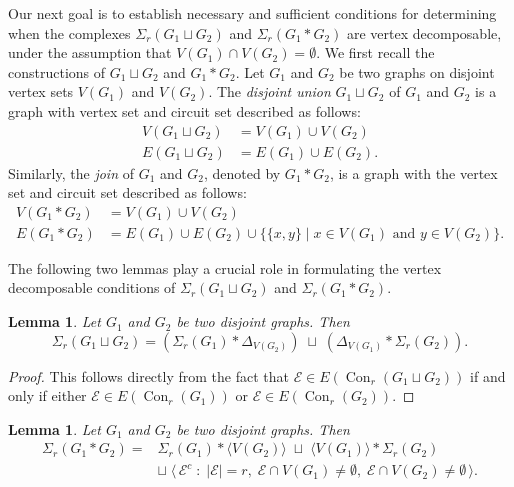 \documentclass[12pt,reqno]{amsart}
\newtheorem{lemma}[proposition]{Lemma}
\theoremstyle{definition}
\def\E{\mathcal{E}}
\begin{document}
\medskip
    
Our next goal is to establish necessary and sufficient conditions for determining when the complexes $\Sigma_r(G_1 \sqcup G_2)$ and $\Sigma_r(G_1 * G_2)$ are vertex decomposable, under the assumption that $V(G_1) \cap V(G_2) = \emptyset$. We first recall the constructions of $G_1 \sqcup G_2$ and $G_1 * G_2$. Let $G_1$ and $G_2$ be two graphs on disjoint vertex sets $V(G_1)$ and $V(G_2)$. The {\it disjoint union} $G_1\sqcup G_2$ of $G_1$ and $G_2$ is a graph with vertex set and circuit set described as follows:
    \begin{align*}
       V(G_1\sqcup G_2)&=V(G_1)\cup V(G_2)\\ 
       E(G_1\sqcup G_2)&=E(G_1)\cup E(G_2).
    \end{align*}
    Similarly, the {\it join} of $G_1$ and $G_2$, denoted by $G_1*G_2$, is a graph with the vertex set and circuit set described as follows:
    \begin{align*}
        V(G_1*G_2)&=V(G_1)\cup V(G_2)\\
        E(G_1*G_2)&=E(G_1)\cup E(G_2)\cup\{\{x,y\}\mid x\in V(G_1)\text{ and }y\in V(G_2)\}.
    \end{align*}
    
    The following two lemmas play a crucial role in formulating the vertex decomposable conditions of $\Sigma_r(G_1 \sqcup G_2)$ and $\Sigma_r(G_1 * G_2)$.

	
	\begin{lemma}\label{Sigma of the disjoint union of graphs}
		Let $G_1$ and $G_2$ be two disjoint graphs. Then
		\[
		\Sigma_r(G_1 \sqcup G_2)
		= (\Sigma_r(G_1) * \Delta_{V(G_2)})
		\;\sqcup\;
		(\Delta_{V(G_1)} * \Sigma_r(G_2)).
		\]
	\end{lemma}
	
	\begin{proof}
    This follows directly from the fact that $\mathcal{E} \in E(\operatorname{Con}_r(G_1 \sqcup G_2))$ if and only if either $\mathcal{E} \in E(\operatorname{Con}_r(G_1))$ or $\mathcal{E} \in E(\operatorname{Con}_r(G_2))$.\end{proof}
	
	\begin{lemma}\label{Sigma of the join of graphs}
		Let $G_1$ and $G_2$ be two disjoint graphs. Then
		\begin{align*}
		    \Sigma_r(G_1 * G_2)
		= & \Sigma_r(G_1) * \langle V(G_2) \rangle
		\;\sqcup\;
		   \langle V(G_1) \rangle * \Sigma_r(G_2)\\
		& \sqcup\; 
		\big\langle\, \E^c \;:\; |\E|=r,\; \E \cap V(G_1)\neq\emptyset,\; \E \cap V(G_2)\neq\emptyset \,\big\rangle.
		\end{align*}
	\end{lemma}
	
\end{document}
